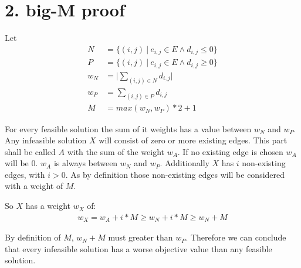 \section*{2. big-M proof}
Let
\begin{align*}
N &= \{(i,j) \: | \: e_{i,j} \in E \wedge d_{i,j} \leq 0 \} \\
P &= \{(i,j) \: | \: e_{i,j} \in E \wedge d_{i,j} \geq 0 \} \\
w_N &= \lvert \sum_{(i,j) \in N} d_{i,j} \rvert \\ 
w_P &= \sum_{(i,j) \in P} d_{i,j} \\ 
\textit{M} &= max( w_N , w_P ) * 2 + 1
\end{align*}

For every feasible solution the sum of it weights has a value between $w_N$ and $w_P$. Any infeasible solution $X$ will consist of zero or more existing edges. This part shall be called $A$ with the sum of the weight $w_A$. If no existing edge is chosen $w_A$ will be $0$. $w_A$ is always between $w_N$ and $w_P$. Additionally $X$ has $i$ non-existing edges, with $i>0$. As by definition those non-existing edges will be considered with a weight of $M$.

So $X$ has a weight $w_X$ of:
\begin{align*}
w_X = w_A + i * M \geq w_N + i * M \geq w_N + M
\end{align*}

By definition of $M$,  $w_N + M$ must greater than $w_P$. Therefore we can conclude that every infeasible solution has a worse objective value than any feasible solution.